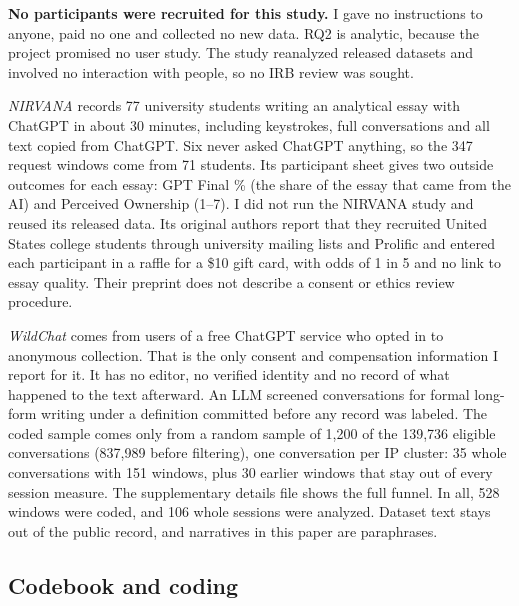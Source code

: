 \documentclass[manuscript,screen]{acmart}
\begin{document}
\textbf{No participants were recruited for this study.} I gave no instructions to anyone, paid no one and collected no new data. RQ2 is analytic, because the project promised no user study. The study reanalyzed released datasets and involved no interaction with people, so no IRB review was sought.

\emph{NIRVANA} \cite{jelson2026nirvana} records 77 university students writing an analytical essay with ChatGPT in about 30 minutes, including keystrokes, full conversations and all text copied from ChatGPT. Six never asked ChatGPT anything, so the 347 request windows come from 71 students. Its participant sheet gives two outside outcomes for each essay: GPT Final \% (the share of the essay that came from the AI) and Perceived Ownership (1--7). I did not run the NIRVANA study and reused its released data. Its original authors report that they recruited United States college students through university mailing lists and Prolific and entered each participant in a raffle for a \$10 gift card, with odds of 1 in 5 and no link to essay quality. Their preprint does not describe a consent or ethics review procedure.

\emph{WildChat} \cite{zhao2024} comes from users of a free ChatGPT service who opted in to anonymous collection. That is the only consent and compensation information I report for it. It has no editor, no verified identity and no record of what happened to the text afterward. An LLM screened conversations for formal long-form writing under a definition committed before any record was labeled. The coded sample comes only from a random sample of 1,200 of the 139,736 eligible conversations (837,989 before filtering), one conversation per IP cluster: 35 whole conversations with 151 windows, plus 30 earlier windows that stay out of every session measure. The supplementary details file shows the full funnel. In all, 528 windows were coded, and 106 whole sessions were analyzed. Dataset text stays out of the public record, and narratives in this paper are paraphrases.

\subsection{Codebook and coding}
\end{document}
